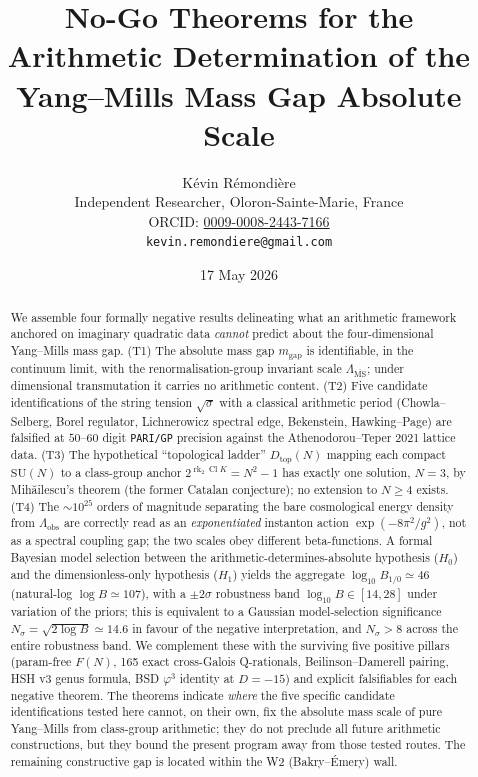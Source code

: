 \documentclass[aps,prl,reprint,superscriptaddress,floatfix,nofootinbib,amssymb]{revtex4-2}
\theoremstyle{definition}
\theoremstyle{remark}
\DeclareMathOperator{\Cl}{Cl}
\DeclareMathOperator{\rk}{rk}
\newcommand{\msb}{\overline{\mathrm{MS}}}
\begin{document}
\title{No-Go Theorems for the Arithmetic Determination of the\\
Yang--Mills Mass Gap Absolute Scale}

\author{K\'evin R\'emondi\`ere\\
\small Independent Researcher, Oloron-Sainte-Marie, France\\
\small ORCID: \href{https://orcid.org/0009-0008-2443-7166}{0009-0008-2443-7166}\\
\small \texttt{kevin.remondiere@gmail.com}}
\date{17 May 2026}

\begin{abstract}
We assemble four formally negative results delineating what an arithmetic
framework anchored on imaginary quadratic data \emph{cannot} predict about
the four-dimensional Yang--Mills mass gap. (T1) The absolute mass gap
$m_{\text{gap}}$ is identifiable, in the continuum limit, with the
renormalisation-group invariant scale $\Lambda_{\msb}$; under
dimensional transmutation it carries no arithmetic content. (T2) Five
candidate identifications of the string tension $\sqrt{\sigma}$ with a
classical arithmetic period (Chowla--Selberg, Borel regulator,
Lichnerowicz spectral edge, Bekenstein, Hawking--Page) are falsified at
$50$--$60$ digit \texttt{PARI/GP} precision against the
Athenodorou--Teper 2021 lattice data. (T3) The hypothetical
``topological ladder'' $D_{\mathrm{top}}(N)$ mapping each compact
$\mathrm{SU}(N)$ to a class-group anchor $2^{\rk_2 \Cl K} = N^2-1$ has
exactly one solution, $N=3$, by Mih\u{a}ilescu's theorem (the former
Catalan conjecture); no extension to $N\ge 4$ exists. (T4) The
$\sim\!10^{25}$ orders of magnitude separating the bare cosmological
energy density from $\Lambda_{\text{obs}}$ are correctly read as an
\emph{exponentiated} instanton action $\exp(-8\pi^2/g^2)$, not as a
spectral coupling gap; the two scales obey different beta-functions.
A formal Bayesian model selection between the arithmetic-determines-absolute
hypothesis ($H_0$) and the dimensionless-only hypothesis ($H_1$) yields
the aggregate $\log_{10} B_{1/0} \simeq 46$ (natural-log
$\log B \simeq 107$), with a $\pm 2\sigma$ robustness band
$\log_{10} B \in [14, 28]$ under variation of the priors; this is
equivalent to a Gaussian model-selection significance
$N_\sigma = \sqrt{2 \log B} \simeq 14.6$ in favour of the
negative interpretation, and $N_\sigma > 8$ across the entire
robustness band. We complement these with the surviving five positive
pillars (param-free $F(N)$, 165 exact cross-Galois Q-rationals,
Beilinson--Damerell pairing, HSH v3 genus formula, BSD $\varphi^3$
identity at $D=-15$) and explicit falsifiables for each negative
theorem. The theorems indicate \emph{where} the five specific candidate
identifications tested here cannot, on their own, fix the absolute
mass scale of pure Yang--Mills from class-group arithmetic; they do
not preclude all future arithmetic constructions, but they bound the
present program away from those tested routes. The remaining
constructive gap is located within the W2 (Bakry--\'Emery) wall.
\end{abstract}
\end{document}
